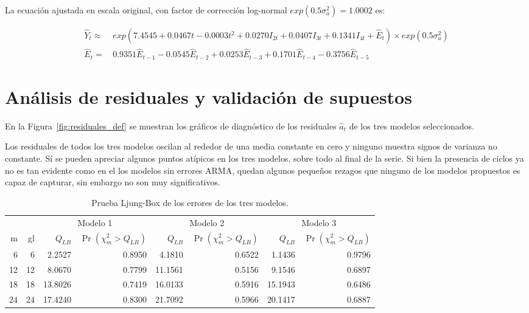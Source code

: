 \documentclass[11pt, letterpaper, twoside]{article}
\begin{document}
La ecuación ajustada en escala original, con factor de corrección log-normal $exp(0.5 \sigma_a^2)=1.0002$ es:

\begin{align}
\label{eq:mod3_ar5f_aju}
    \hat{Y}_t \approx & \, exp(7.4545 + 0.0467 t - 0.0003 t^2 + 0.0270 I_{2t} + 0.0407 I_{3t} + 0.1341 I_{4t} + \hat{E}_t) \times exp(0.5\sigma_a^2)\\
    \hat{E}_t = & \, 0.9351 \hat{E}_{t-1} - 0.0545 \hat{E}_{t-2} + 0.0253 \hat{E}_{t-3} + 0.1701 \hat{E}_{t-4} - 0.3756 \hat{E}_{t-5} \nonumber
\end{align}

\section{Análisis de residuales y validación de supuestos}

En la Figura~\ref{fig:residuales_def} se muestran los gráficos de diagnóstico de los residuales $\hat{a}_t$ de los tres modelos seleccionados.

Los residuales de todos los tres modelos oscilan al rededor de una media constante en cero y ninguno muestra signos de varianza no constante. Sí se pueden apreciar algunos puntos atípicos en los tres modelos, sobre todo al final de la serie. Si bien la presencia de ciclos ya no es tan evidente como en el los modelos sin errores ARMA, quedan algunos pequeños rezagos que ninguno de los modelos propuestos es capaz de capturar, sin embargo no son muy significativos.

\begin{table}[ht!]
\caption{Prueba Ljung-Box de los errores de los tres modelos.}
\label{tab:res_mod1_ar5}
\centering
\begin{tabular}{rrrrrrrr}
& & \multicolumn{2}{c}{Modelo 1} & \multicolumn{2}{c}{Modelo 2} & \multicolumn{2}{c}{Modelo 3} \\
\cline{3-8}
m & gl & $Q_{LB}$ & \small{$\Pr(\chi_m^2 >Q_{LB})$} & $Q_{LB}$ & \small{$\Pr(\chi_m^2 >Q_{LB})$} & $Q_{LB}$ & \small{$\Pr(\chi_m^2 >Q_{LB})$} \\
  \hline
6 & 6 & 2.2527 & 0.8950 & 4.1810 & 0.6522 & 1.1436 & 0.9796 \\
  12 & 12 & 8.0670 & 0.7799 & 11.1561 & 0.5156 & 9.1546 & 0.6897 \\
  18 & 18 & 13.8026 & 0.7419 & 16.0133 & 0.5916 & 15.1943 & 0.6486 \\
  24 & 24 & 17.4240 & 0.8300 & 21.7092 & 0.5966 & 20.1417 & 0.6887 \\
   \hline
\end{tabular}
\end{table}
\end{document}
